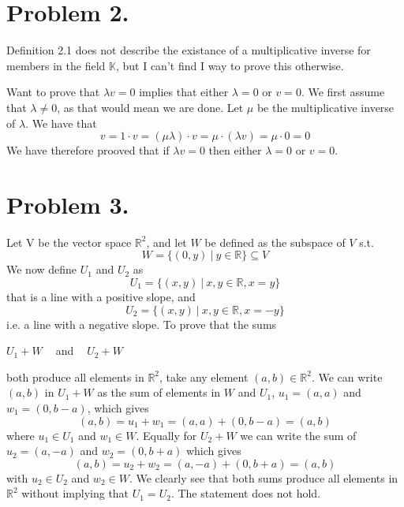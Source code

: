 \documentclass[a4paper,11pt,norsk]{article}
\begin{document}
\section*{Problem 2.}
Definition 2.1 does not describe the existance of a multiplicative inverse for members in the field $\mathbb{K}$, but 
I can't find I way to prove this otherwise.

Want to prove that $\lambda v = 0$ implies that either $\lambda = 0$ or $v = 0$. We first assume that $\lambda \neq 0$, as that 
would mean we are done. Let $\mu$ be the multiplicative inverse of $\lambda$. We have that 
$$v = 1 \cdot v = (\mu \lambda) \cdot v = \mu \cdot (\lambda v) = \mu \cdot 0 = 0$$
We have therefore prooved that if $\lambda v = 0$ then either $\lambda = 0$ or $v = 0$.

\section*{Problem 3.}
Let V be the vector space $\mathbb{R}^2$, and let $W$ be defined as the subspace of $V$ s.t. 
$$W = \{(0, y) \:|\: y \in \mathbb{R}\} \subseteq V$$
We now define $U_1$ and $U_2$ as 
$$U_1 = \{ (x, y) \:|\: x, y \in \mathbb{R}, x = y \}$$
that is a line with a positive slope, and 
$$U_2 = \{ (x, y) \:|\: x, y \in \mathbb{R}, x = -y \}$$
i.e. a line with a negative slope. To prove that the sums
\begin{center}
    $U_1 + W\:\:\:\:$ and $\:\:\:\:U_2 + W$
\end{center}
both produce all elements in $\mathbb{R}^2$, take any element $(a, b) \in \mathbb{R}^2$. 
We can write $(a, b)$ in $U_1 + W$ as the sum of elements in $W$ and $U_1$, $u_1 = (a, a)$ and $w_1 = (0, b - a)$, which gives
$$(a, b) = u_1 + w_1 = (a, a) + (0, b - a) = (a, b)$$
where $u_1 \in U_1$ and $w_1 \in W$. Equally for $U_2 + W$ we can write the sum of $u_2 = (a, -a)$ and $w_2 = (0, b + a)$ which gives
$$(a, b) = u_2 + w_2 = (a, -a) + (0, b + a) = (a, b)$$
with $u_2 \in U_2$ and $w_2 \in W$. We clearly see that both sums produce all 
elements in $\mathbb{R}^2$ without implying that $U_1 = U_2$. The statement does not hold.
\end{document}
